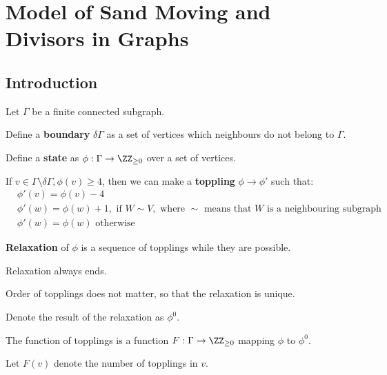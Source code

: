 \documentclass[11pt]{scrartcl}
\begin{document}
  \section{Model of Sand Moving and Divisors in Graphs}

  \subsection{Introduction}

  \begin{definition}
    Let $\Gamma$ be a finite connected subgraph.

    Define a \textbf{boundary} $\delta \Gamma$ as a set of vertices which
    neighbours do not belong to $\Gamma$.

    Define a \textbf{state} as $\phi: \Gamma \to \ZZ_{\geq 0}$ over a set of
    vertices.

    If $v\in \Gamma \setminus \delta \Gamma, \phi(v) \geq 4$, then we can
    make a \textbf{toppling} $\phi \to \phi'$ such that:
    \begin{align}
      &\phi'(v) = \phi(v) - 4\\
      &\phi'(w) = \phi(w) + 1, \text{ if } W \sim V, \text{ where $\sim$ means that $W$ is a neighbouring subgraph}\\
      & \phi'(w) = \phi(w) \text{ otherwise}
    \end{align}

    \textbf{Relaxation} of $\phi$ is a sequence of topplings while they are possible.
  \end{definition}

  \begin{exercise}

    Relaxation always ends.

  \end{exercise}  


  \begin{exercise}

    Order of topplings does not matter, so that the relaxation is
    unique.

  \end{exercise}

  Denote the result of the relaxation as $\phi^{0}$.

  \begin{definition}
    The function of topplings is a function
    $F: \Gamma  \to \ZZ_{\geq 0}$ mapping $\phi$
    to $\phi^{0}$.

    Let $F(v)$ denote the number of topplings in $v$.
  \end{definition}
\end{document}
